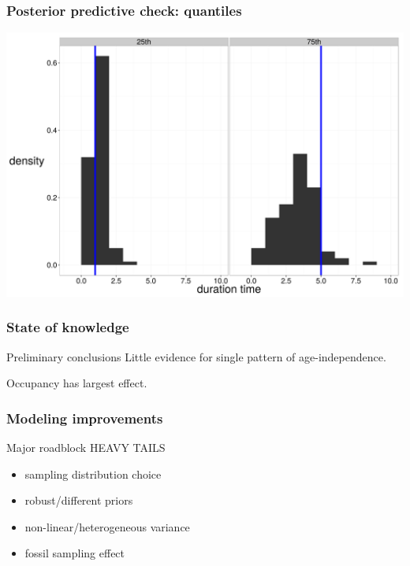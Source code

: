 \documentclass{beamer}
\begin{document}
\begin{frame}
  \frametitle{Posterior predictive check: quantiles}
  \begin{center}
    \includegraphics[height = 0.8\textheight, width = \textwidth, keepaspectratio = true]{figure/wei_quant_ppc}
  \end{center}
\end{frame}

\begin{frame}
  \frametitle{State of knowledge}

  \begin{block}{Preliminary conclusions}
    Little evidence for single pattern of age-independence.

    Occupancy has largest effect.
  \end{block}
\end{frame}

\begin{frame}
  \frametitle{Modeling improvements}

  \begin{alertblock}{Major roadblock}
    HEAVY TAILS
  \end{alertblock}

  \bigskip

  \begin{itemize}
    \item sampling distribution choice
    \item robust/different priors
    \item non-linear/heterogeneous variance
    \item fossil sampling effect
  \end{itemize}
\end{frame}
\end{document}
